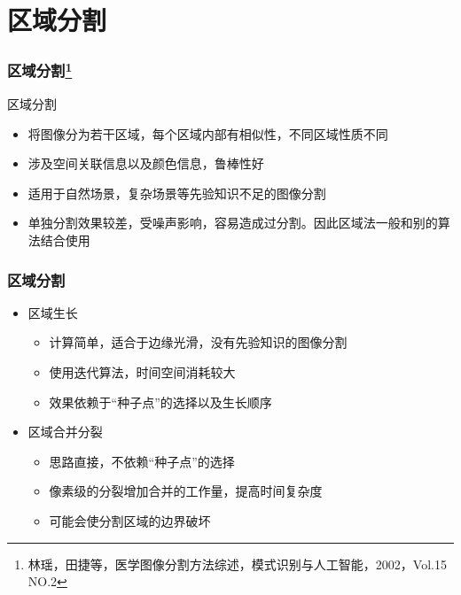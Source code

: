 \documentclass[notheorems,mathserif,table,compress]{beamer}  %
\begin{document}
\section{区域分割}
\begin{frame}
  \frametitle{区域分割\footnote{林瑶，田捷等，医学图像分割方法综述，模式识别与人工智能，2002，Vol.15 NO.2}}
   区域分割
   \begin{itemize}
   \item 将图像分为若干区域，每个区域内部有相似性，不同区域性质不同
   \item 涉及空间关联信息以及颜色信息，鲁棒性好
   \item 适用于自然场景，复杂场景等先验知识不足的图像分割 
   \item 单独分割效果较差，受噪声影响，容易造成过分割。因此区域法一般和别的算法结合使用
   \end{itemize}
\end{frame}

\begin{frame}
  \frametitle{区域分割}
   \begin{itemize}
   \item 区域生长
         \begin{itemize}
         \item 计算简单，适合于边缘光滑，没有先验知识的图像分割
         \item 使用迭代算法，时间空间消耗较大
         \item 效果依赖于“种子点”的选择以及生长顺序
         \end{itemize}
   \item 区域合并分裂
         \begin{itemize}
         \item 思路直接，不依赖“种子点”的选择
         \item 像素级的分裂增加合并的工作量，提高时间复杂度
         \item 可能会使分割区域的边界破坏
         \end{itemize}         
   \end{itemize}
\end{frame}
\end{document}

